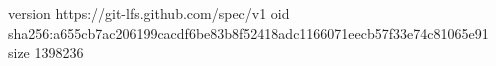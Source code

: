 version https://git-lfs.github.com/spec/v1
oid sha256:a655cb7ac206199cacdf6be83b8f52418adc1166071eecb57f33e74c81065e91
size 1398236
